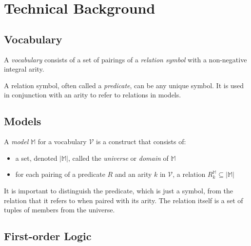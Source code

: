 \section{Technical Background}

	\subsection{Vocabulary}

		A \emph{vocabulary} consists of a set of pairings of a \emph{relation
		symbol} with a non-negative integral arity.

		A relation symbol, often called a \emph{predicate}, can be any unique
		symbol. It is used in conjunction with an arity to refer to relations
		in models.

	\subsection{Models}

		A \emph{model} $\mathbb{M}$ for a vocabulary $\mathcal{V}$ is a construct that consists of:
		\begin{itemize}
		\item a set, denoted $|\mathbb{M}|$, called the \emph{universe} or \emph{domain} of $\mathbb{M}$
		\item for each pairing of a predicate $R$ and an arity $k$ in $\mathcal{V}$, a relation $R^\mathbb{M}_k \subseteq |\mathbb{M}|$
		\end{itemize}
		It is important to distinguish the predicate, which is just a symbol,
		from the relation that it refers to when paired with its arity. The
		relation itself is a set of tuples of members from the universe.

	\subsection{First-order Logic}

